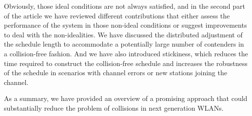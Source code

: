 \documentclass[journal]{IEEEtran}
\begin{document}
Obviously, those ideal conditions are not always satisfied, and in the second part of the article we have reviewed different contributions that either assess the performance of the system in those non-ideal conditions or suggest improvements to deal with the non-idealities.
We have discussed the distributed adjustment of the schedule length to accommodate a potentially large number of contenders in a collision-free fashion.
And we have also introduced stickiness, which reduces the time required to construct the collision-free schedule and increases the robustness of the schedule in scenarios with channel errors or new stations joining the channel.

As a summary, we have provided an overview of a promising approach that could substantially reduce the problem of collisions in next generation WLANs.



%
%



%
%
\end{document}
